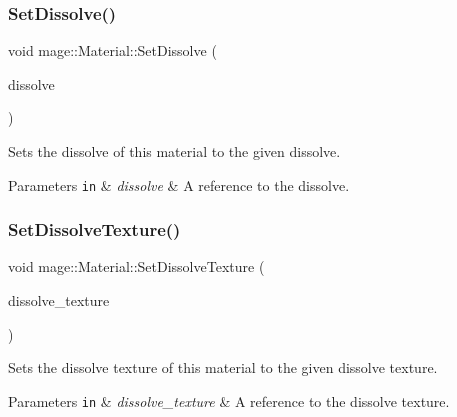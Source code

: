 \subsubsection{\texorpdfstring{Set\+Dissolve()}{SetDissolve()}}
{\footnotesize\ttfamily void mage\+::\+Material\+::\+Set\+Dissolve (\begin{DoxyParamCaption}\item[{float}]{dissolve }\end{DoxyParamCaption})\hspace{0.3cm}{\ttfamily [noexcept]}}

Sets the dissolve of this material to the given dissolve.


\begin{DoxyParams}[1]{Parameters}
\mbox{\tt in}  & {\em dissolve} & A reference to the dissolve. \\
\hline
\end{DoxyParams}
\hypertarget{structmage_1_1_material_ae2afaedc1d81fc753b060cca5d86db91}{}\label{structmage_1_1_material_ae2afaedc1d81fc753b060cca5d86db91} 
\subsubsection{\texorpdfstring{Set\+Dissolve\+Texture()}{SetDissolveTexture()}}
{\footnotesize\ttfamily void mage\+::\+Material\+::\+Set\+Dissolve\+Texture (\begin{DoxyParamCaption}\item[{\hyperlink{namespacemage_a1e01ae66713838a7a67d30e44c67703e}{Shared\+Ptr}$<$ \hyperlink{classmage_1_1_texture}{Texture} $>$}]{dissolve\+\_\+texture }\end{DoxyParamCaption})}

Sets the dissolve texture of this material to the given dissolve texture.


\begin{DoxyParams}[1]{Parameters}
\mbox{\tt in}  & {\em dissolve\+\_\+texture} & A reference to the dissolve texture. \\
\hline
\end{DoxyParams}
\hypertarget{structmage_1_1_material_abc2d6d144f32ca33b2f121b8f5637341}{}\label{structmage_1_1_material_abc2d6d144f32ca33b2f121b8f5637341} 
